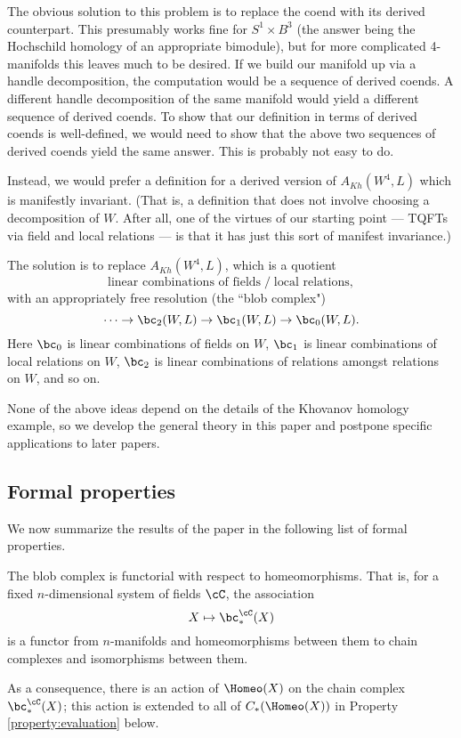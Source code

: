 The obvious solution to this problem is to replace the coend with its derived counterpart.
This presumably works fine for $S^1\times B^3$ (the answer being the Hochschild homology
of an appropriate bimodule), but for more complicated 4-manifolds this leaves much to be desired.
If we build our manifold up via a handle decomposition, the computation
would be a sequence of derived coends.
A different handle decomposition of the same manifold would yield a different
sequence of derived coends.
To show that our definition in terms of derived coends is well-defined, we
would need to show that the above two sequences of derived coends yield the same answer.
This is probably not easy to do.

Instead, we would prefer a definition for a derived version of $A_{Kh}(W^4, L)$
which is manifestly invariant.
(That is, a definition that does not
involve choosing a decomposition of $W$.
After all, one of the virtues of our starting point --- TQFTs via field and local relations ---
is that it has just this sort of manifest invariance.)

The solution is to replace $A_{Kh}(W^4, L)$, which is a quotient
\[
 \text{linear combinations of fields} \;\big/\; \text{local relations} ,
\]
with an appropriately free resolution (the ``blob complex")
\[
	\cdots\to \bc_2(W, L) \to \bc_1(W, L) \to \bc_0(W, L) .
\]
Here $\bc_0$ is linear combinations of fields on $W$,
$\bc_1$ is linear combinations of local relations on $W$,
$\bc_2$ is linear combinations of relations amongst relations on $W$,
and so on.

None of the above ideas depend on the details of the Khovanov homology example,
so we develop the general theory in this paper and postpone specific applications
to later papers.



\subsection{Formal properties}
\label{sec:properties}
We now summarize the results of the paper in the following list of formal properties.

\begin{property}[Functoriality]
\label{property:functoriality}%
The blob complex is functorial with respect to homeomorphisms. That is, 
for a fixed $n$-dimensional system of fields $\cC$, the association
\begin{equation*}
X \mapsto \bc_*^{\cC}(X)
\end{equation*}
is a functor from $n$-manifolds and homeomorphisms between them to chain complexes and isomorphisms between them.
\end{property}
As a consequence, there is an action of $\Homeo(X)$ on the chain complex $\bc_*^\cC(X)$; this action is extended to all of $C_*(\Homeo(X))$ in Property \ref{property:evaluation} below.

